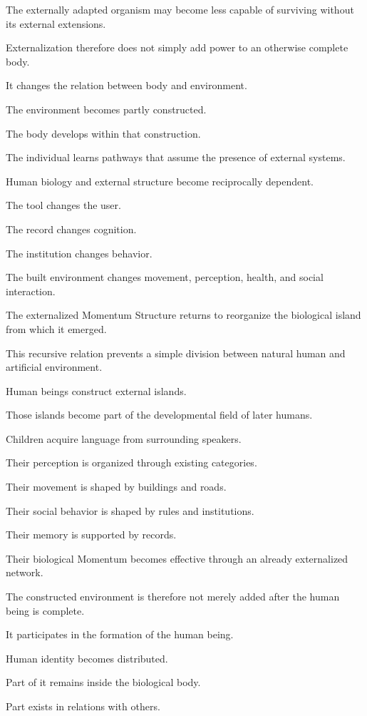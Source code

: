 The externally adapted organism may become less capable of surviving without its external extensions.

Externalization therefore does not simply add power to an otherwise complete body.

It changes the relation between body and environment.

The environment becomes partly constructed.

The body develops within that construction.

The individual learns pathways that assume the presence of external systems.

Human biology and external structure become reciprocally dependent.

The tool changes the user.

The record changes cognition.

The institution changes behavior.

The built environment changes movement, perception, health, and social interaction.

The externalized Momentum Structure returns to reorganize the biological island from which it emerged.

This recursive relation prevents a simple division between natural human and artificial environment.

Human beings construct external islands.

Those islands become part of the developmental field of later humans.

Children acquire language from surrounding speakers.

Their perception is organized through existing categories.

Their movement is shaped by buildings and roads.

Their social behavior is shaped by rules and institutions.

Their memory is supported by records.

Their biological Momentum becomes effective through an already externalized network.

The constructed environment is therefore not merely added after the human being is complete.

It participates in the formation of the human being.

Human identity becomes distributed.

Part of it remains inside the biological body.

Part exists in relations with others.

